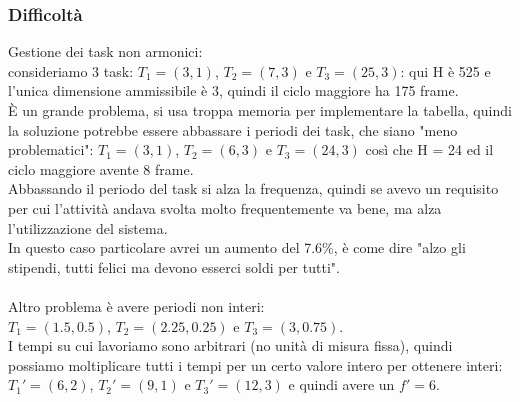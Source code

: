 \documentclass[12pt, oneside]{extbook}
\begin{document}
\subsubsection{Difficoltà}
Gestione dei task non armonici:\\
consideriamo 3 task: $T_1 = (3,1)$, $T_2 = (7,3)$ e $T_3 = (25,3)$: qui H è 525 e l'unica dimensione ammissibile è 3, quindi il ciclo maggiore ha 175 frame.\\
È un grande problema, si usa troppa memoria per implementare la tabella, quindi la soluzione potrebbe essere abbassare i periodi dei task, che siano "meno problematici": $T_1 = (3,1)$, $T_2 = (6,3)$ e $T_3 = (24,3)$
così che H = 24 ed il ciclo maggiore avente 8 frame.\\ Abbassando il periodo del task si alza la frequenza, quindi se avevo un requisito per cui l'attività andava svolta molto frequentemente va bene, ma alza l'utilizzazione del sistema.\\
In questo caso particolare avrei un aumento del 7.6\%, è come dire "alzo gli stipendi, tutti felici ma devono esserci soldi per tutti".\\\\
Altro problema è avere periodi non interi:\\
$T_1 = (1.5,0.5)$, $T_2 = (2.25,0.25)$ e $T_3 = (3,0.75)$.\\
I tempi su cui lavoriamo sono arbitrari (no unità di misura fissa), quindi possiamo moltiplicare tutti i tempi per un certo valore intero per ottenere interi: $T_1' = (6,2)$, $T_2' = (9,1)$ e $T_3' = (12,3)$ e quindi avere un $f' = 6$.\\
\end{document}
